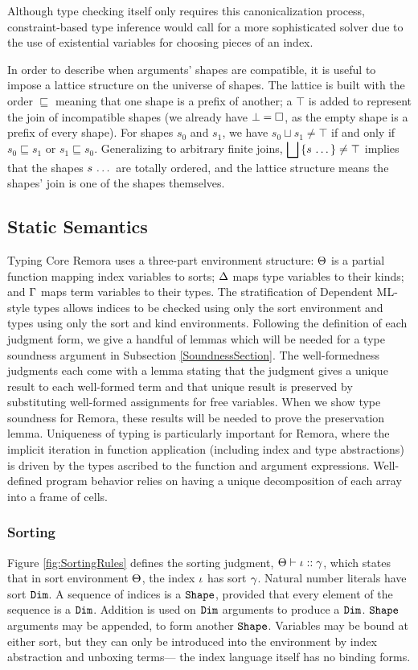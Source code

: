 Although type checking itself only requires this canonicalization process,
constraint-based type inference would call for a more sophisticated solver
due to the use of existential variables for choosing pieces of an index.

In order to describe when arguments' shapes are compatible,
it is useful to impose a lattice structure on the universe of shapes.
The lattice is built with the order $\sqsubseteq$ meaning that one shape is a prefix of another;
a $\top$ is added to represent the join of incompatible shapes
(we already have $\bot = \square$,
as the empty shape is a prefix of every shape).
For shapes $s_0$ and $s_1$,
we have $s_0 \sqcup s_1 \not= \top$ if and only if
$s_0 \sqsubseteq s_1$ or $s_1 \sqsubseteq s_0$.
Generalizing to arbitrary finite joins,
$\displaystyle\bigsqcup\left\{ s \, \ldots \, \right\} \not= \top$
implies that the shapes $s \, \ldots \,$ are totally ordered,
and the lattice structure means the shapes' join is one of the shapes themselves.

\subsection{Static Semantics}
\label{ssec:StaticSemantics}
Typing Core Remora uses a three-part environment structure:
$\Theta$ is a partial function mapping index variables to sorts;
$\Delta$ maps type variables to their kinds;
and $\Gamma$ maps term variables to their types.
The stratification of Dependent ML-style types
allows indices to be checked using only the sort environment
and types using only the sort and kind environments.
Following the definition of each judgment form,
we give a handful of lemmas
which will be needed for a type soundness argument in Subsection \ref{SoundnessSection}.
The well-formedness judgments
each come with a lemma stating that
the judgment gives a unique result to each well-formed term
and that unique result is preserved by
substituting well-formed assignments for free variables.
When we show type soundness for Remora,
these results will be needed to prove the preservation lemma.
Uniqueness of typing is particularly important for Remora,
where the implicit iteration in function application
(including index and type abstractions)
is driven by the types ascribed to the function and argument expressions.
Well-defined program behavior relies on having
a unique decomposition of each array into a frame of cells.

\subsubsection{Sorting}
\FigSortingRules
Figure \ref{fig:SortingRules} defines the sorting judgment,
$\Theta \vdash \mathit{\iota} :: \mathit{\gamma}$,
which states that in sort environment $\Theta$,
the index $\mathit{\iota}$ has sort $\mathit{\gamma}$.
Natural number literals have sort $\text{\tt Dim}$.
A sequence of indices is a $\text{\tt Shape}$,
provided that every element of the sequence is a $\text{\tt Dim}$.
Addition is used on $\text{\tt Dim}$ arguments to produce a $\text{\tt Dim}$.
$\text{\tt Shape}$ arguments may be appended,
to form another $\text{\tt Shape}$.
Variables may be bound at either sort,
but they can only be introduced into the environment by
index abstraction and unboxing terms---%
the index language itself has no binding forms.

